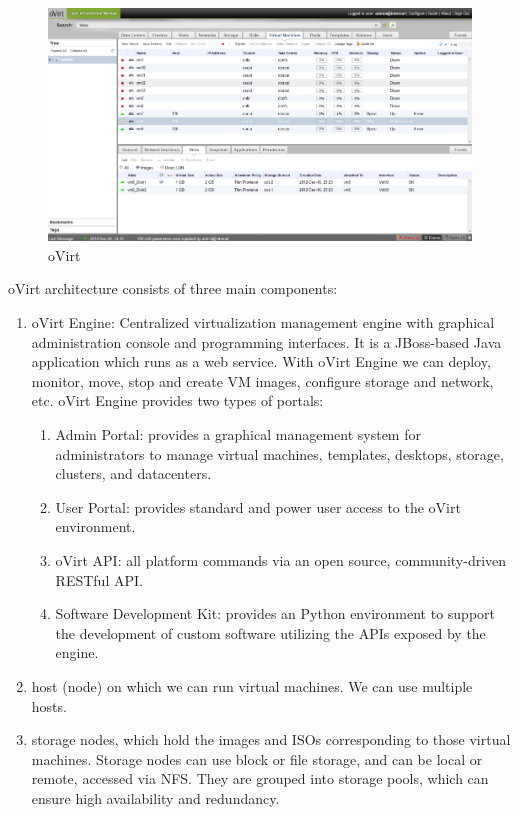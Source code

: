 \begin{figure}[H]
\centering
\includegraphics[scale=0.45]{ovirt.png}
\caption{oVirt}
\end{figure}

oVirt architecture consists of three main components:
\begin{enumerate}
\item oVirt Engine: Centralized virtualization management engine with graphical administration console and programming interfaces. It is a JBoss-based Java application which runs as a web service. With oVirt Engine we can deploy, monitor, move, stop and create VM images, configure storage and network, etc. oVirt Engine provides two types of portals:
\begin{enumerate}
\item Admin Portal: provides a graphical management system for administrators to manage virtual machines, templates, desktops, storage, clusters, and datacenters.
\item User Portal: provides standard and power user access to the oVirt environment.
\item oVirt API: all platform commands via an open source, community-driven RESTful API.
\item Software Development Kit: provides an Python environment to support the development of custom software utilizing the APIs exposed by the engine.
\end{enumerate}
\item host (node) on which we can run virtual machines. We can use multiple hosts.
\item storage nodes, which hold the images and ISOs corresponding to those virtual machines. Storage nodes can use block or file storage, and can be local or remote, accessed via NFS. They are grouped into storage pools, which can ensure high availability and redundancy.
\end{enumerate}

